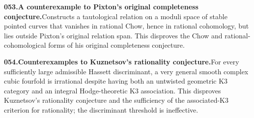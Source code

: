\documentclass[11pt,a4paper]{article}
\begin{document}
  \par \begin{minipage}{\linewidth}
  \fontsize{10.5}{12.6}\selectfont\RaggedRight
  \hypertarget{result 053}{}
  {\bfseries\textcolor{muted}{053.}\enspace A counterexample to Pixton's original completeness conjecture.}\enspace Constructs a tautological relation on a moduli space of stable pointed curves that vanishes in rational Chow, hence in rational cohomology, but lies outside Pixton's original relation span. This disproves the Chow and rational-cohomological forms of his original completeness conjecture.\par
  \end{minipage}\par\vspace{5pt}



  \par \begin{minipage}{\linewidth}
  \fontsize{10.5}{12.6}\selectfont\RaggedRight
  \hypertarget{result 054}{}
  {\bfseries\textcolor{muted}{054.}\enspace Counterexamples to Kuznetsov's rationality conjecture.}\enspace For every sufficiently large admissible Hassett discriminant, a very general smooth complex cubic fourfold is irrational despite having both an untwisted geometric K3 category and an integral Hodge-theoretic K3 association. This disproves Kuznetsov's rationality conjecture and the sufficiency of the associated-K3 criterion for rationality; the discriminant threshold is ineffective.\par
  \end{minipage}\par\vspace{5pt}
\end{document}

